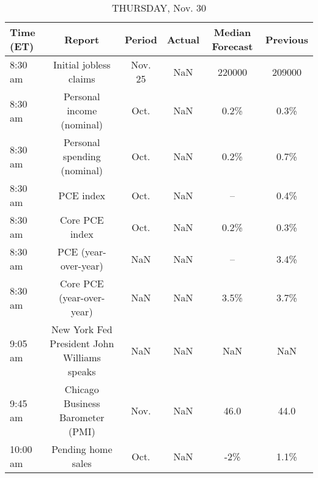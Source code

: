 \documentclass{article}%
\begin{document}
\begin{table}[htbp]%
\caption{THURSDAY, Nov. 30}%
\centering%
\begin{adjustbox}{width=1\textwidth}%
\begin{tabular}{lccccc}
\toprule
Time (ET) &                                      Report &  Period & Actual & Median Forecast & Previous \\
\midrule
  8:30 am &                      Initial jobless claims & Nov. 25 &    NaN &          220000 &   209000 \\
  8:30 am &                   Personal income (nominal) &    Oct. &    NaN &            0.2\% &     0.3\% \\
  8:30 am &                 Personal spending (nominal) &    Oct. &    NaN &            0.2\% &     0.7\% \\
  8:30 am &                                   PCE index &    Oct. &    NaN &              -- &     0.4\% \\
  8:30 am &                              Core PCE index &    Oct. &    NaN &            0.2\% &     0.3\% \\
  8:30 am &                        PCE (year-over-year) &     NaN &    NaN &              -- &     3.4\% \\
  8:30 am &                   Core PCE (year-over-year) &     NaN &    NaN &            3.5\% &     3.7\% \\
  9:05 am & New York Fed President John Williams speaks &     NaN &    NaN &             NaN &      NaN \\
  9:45 am &            Chicago Business Barometer (PMI) &    Nov. &    NaN &            46.0 &     44.0 \\
 10:00 am &                          Pending home sales &    Oct. &    NaN &             -2\% &     1.1\% \\
\bottomrule
\end{tabular}
%
\end{adjustbox}%
\end{table}

%
\end{document}
